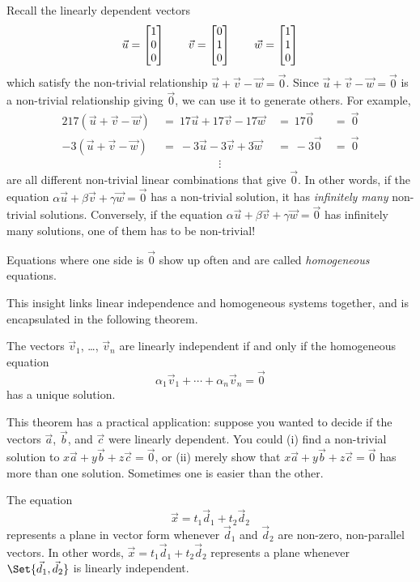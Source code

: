 Recall the linearly dependent vectors 
\[
	\vec u=\mat{1\\0\\0}\qquad \vec v=\mat{0\\1\\0}\qquad \vec w=\mat{1\\1\\0}
\]
which satisfy the non-trivial relationship $\vec u+\vec v-\vec w=\vec 0$. Since $\vec u+\vec v-\vec w=\vec 0$
is a non-trivial relationship giving $\vec 0$, we can use it to generate others. For example,
\begin{alignat*}{2}
	17(\vec u+\vec v-\vec w)\ &=\ 17\vec u+17\vec v-17\vec w\ &=\ 17\vec 0\ &=\ \vec 0\\
	-3(\vec u+\vec v-\vec w)\ &=\ -3\vec u-3\vec v+3\vec w\ &=\ -3\vec 0\ &=\ \vec 0\\
	&\hspace{5em}\vdots&&
\end{alignat*}
are all different non-trivial linear combinations that give $\vec 0$. In other words, if 
the equation $\alpha\vec u+\beta \vec v+\gamma \vec w=\vec 0$ has a non-trivial solution,
it has \emph{infinitely many} non-trivial solutions. Conversely, if  the equation
$\alpha\vec u+\beta \vec v+\gamma \vec w=\vec 0$ has infinitely many solutions, one of them
has to be non-trivial!

Equations where one side is $\vec 0$ show up often and are called \emph{homogeneous} equations.

This insight links linear independence and homogeneous systems together, and is encapsulated
in the following theorem.

\begin{theorem}
	The vectors $\vec v_1$, \ldots, $\vec v_n$ are linearly independent if and only if
	the homogeneous equation
	\[
		\alpha_1\vec v_1+\cdots +\alpha_n\vec v_n=\vec 0
	\]
	has a unique solution.
\end{theorem}

This theorem has a practical application: suppose you wanted to decide if the vectors $\vec a$, $\vec b$, and
$\vec c$ were linearly dependent. You could (i) find a non-trivial solution to $x\vec a+y\vec b+z\vec c=\vec 0$, 
or (ii) merely show that $x\vec a+y\vec b+z\vec c=\vec 0$ has more than one solution. Sometimes one is easier than
the other.


The equation
\[
	\vec x=t_1\vec d_1+t_2\vec d_2
\]
represents a plane in vector form whenever $\vec d_1$ and $\vec d_2$ are non-zero, non-parallel vectors.
In other words, 
	$\vec x=t_1\vec d_1+t_2\vec d_2$
	represents a plane whenever $\Set{\vec d_1,\vec d_2}$ is linearly independent.


